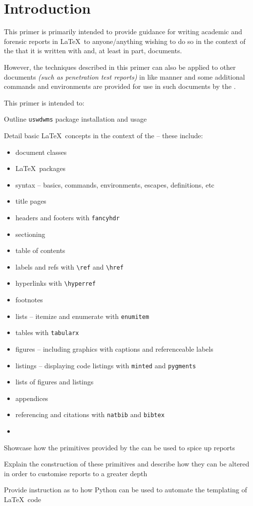 \section{Introduction}
This primer is primarily intended to provide guidance for writing academic and forensic reports in \LaTeX\ to anyone/anything wishing to do so in the context of the \uswdwmspkg{} that it is written with and, at least in part, documents.

However, the techniques described in this primer can also be applied to other documents \textit{(such as penetration test reports)} in like manner and some additional commands and environments are provided for use in such documents by the \uswdwmspkg{}.

This primer is intended to:
\begin{methodology0}
  \item Outline \texttt{uswdwms} package installation and usage
  \item Detail basic \LaTeX\ concepts in the context of the \uswdwmspkg{} -- these include:
    \begin{itemize}
      \item document classes
      \item \LaTeX\ packages
      \item syntax -- basics, commands, environments, escapes, definitions, etc
      \item title pages
      \item headers and footers with \texttt{fancyhdr}
      \item sectioning
      \item table of contents
      \item labels and refs with \texttt{\textbackslash ref} and \texttt{\textbackslash href}
      \item hyperlinks with \texttt{\textbackslash hyperref}
      \item footnotes
      \item lists -- itemize and enumerate with \texttt{enumitem}
      \item tables with \texttt{tabularx}
      \item figures -- including graphics with captions and referenceable labels
      \item listings -- displaying code listings with \texttt{minted} and \texttt{pygments}
      \item lists of figures and listings
      \item appendices
      \item referencing and citations with \texttt{natbib} and \texttt{bibtex}
      \item {}
    \end{itemize}
  \item Showcase how the primitives provided by the \uswdwmspkg{} can be used to spice up reports
  \item Explain the construction of these primitives and describe how they can be altered in order to customise reports to a greater depth
  \item Provide instruction as to how Python can be used to automate the templating of \LaTeX\ code
\end{methodology0}
